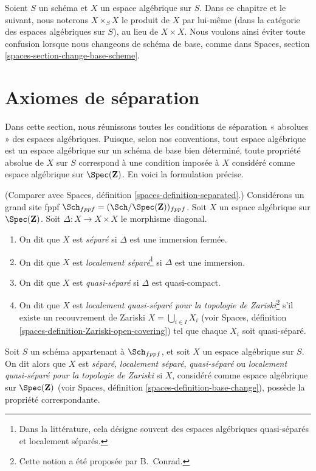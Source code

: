 \medskip\noindent
Soient $S$ un schéma et $X$ un espace algébrique sur $S$.
Dans ce chapitre et le suivant, nous noterons $X \times_S X$
le produit de $X$ par lui-même (dans la catégorie des espaces
algébriques sur $S$), au lieu de $X \times X$. Nous voulons ainsi
éviter toute confusion lorsque nous changeons de schéma de base, comme dans
Spaces, section \ref{spaces-section-change-base-scheme}.


\section{Axiomes de séparation}
\label{section-separation}

\noindent
Dans cette section, nous réunissons toutes les conditions de séparation « absolues »
des espaces algébriques. Puisque, selon nos conventions, tout espace algébrique est un
espace algébrique sur un schéma de base bien déterminé, toute propriété absolue
de $X$ sur $S$ correspond à une condition imposée à $X$ considéré
comme espace algébrique sur $\Spec(\mathbf{Z})$. En voici la
formulation précise.

\begin{definition}
\label{definition-separated}
(Comparer avec Spaces, définition \ref{spaces-definition-separated}.)
Considérons un grand site fppf
$\Sch_{fppf} = (\Sch/\Spec(\mathbf{Z}))_{fppf}$.
Soit $X$ un espace algébrique sur
$\Spec(\mathbf{Z})$. Soit $\Delta : X \to X \times X$
le morphisme diagonal.
\begin{enumerate}
\item On dit que $X$ est {\it séparé} si $\Delta$ est une immersion fermée.
\item On dit que $X$ est {\it localement séparé}\footnote{Dans la
littérature, cela désigne souvent des espaces algébriques quasi-séparés et
localement séparés.} si $\Delta$ est une
immersion.
\item On dit que $X$ est {\it quasi-séparé} si $\Delta$ est quasi-compact.
\item On dit que $X$ est {\it localement quasi-séparé pour la topologie de Zariski}\footnote{
Cette notion a été proposée par B.\ Conrad.} s'il
existe un recouvrement de Zariski $X = \bigcup_{i \in I} X_i$ (voir Spaces,
définition \ref{spaces-definition-Zariski-open-covering}) tel que
chaque $X_i$ soit quasi-séparé.
\end{enumerate}
Soit $S$ un schéma appartenant à $\Sch_{fppf}$, et soit
$X$ un espace algébrique sur $S$. On dit alors que $X$ est {\it séparé},
{\it localement séparé}, {\it quasi-séparé} ou
{\it localement quasi-séparé pour la topologie de Zariski}
si $X$, considéré comme espace algébrique sur $\Spec(\mathbf{Z})$ (voir
Spaces, définition \ref{spaces-definition-base-change}),
possède la propriété correspondante.
\end{definition}

